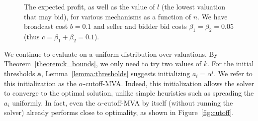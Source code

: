 \begin{figure}
\centering
  \caption{The expected profit, as well as the value of $l$ (the lowest
    valuation that may bid), for various mechanisms as a function of $n$.
    We have
  broadcast cost $b = 0.1$ and  seller and bidder bid costs $\beta_1 =
  \beta_2 = 0.05$ (thus $c = \beta_1+\beta_2 = 0.1$).}\label{fig:general}
\end{figure}

We continue to evaluate on a uniform distribution over valuations.
By Theorem~\ref{theorem:k_bounds}, we only need to try two values of $k$.
For the initial thresholds $\boldsymbol a$, Lemma~\ref{lemma:thresholds}
suggests initializing $a_i = \alpha^i$.  We refer to this initialization as
the $\alpha$-cutoff-MVA.  Indeed, this initialization allows the solver to
converge to the optimal solution, unlike simple heuristics such as
spreading the $a_i$ uniformly.  In fact, even the $\alpha$-cutoff-MVA by
itself (without running the solver) already performs close to optimality,
as shown in Figure~\ref{fig:cutoff}.


